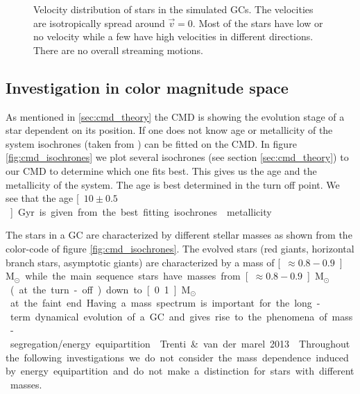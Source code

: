 \begin{figure}[htbp]
\caption{Velocity distribution of stars in the simulated \acp{GC}. The velocities are isotropically spread around \(\vec{v}=0\). Most of the stars have low or no velocity while a few have high velocities in different directions. There are no overall streaming motions.}
\label{fig:velocity_scatter}
\end{figure}


\subsection{Investigation in color magnitude space}\label{sec:cmd_plots}
As mentioned in \ref{sec:cmd_theory} the \ac{CMD} is showing the evolution stage of a star dependent on its position. If one does not know age or metallicity of the system isochrones (taken from \citet{2012MNRAS.427..127B}) can be fitted on the \ac{CMD}. In figure \ref{fig:cmd_isochrones} we plot several isochrones (see section \ref{sec:cmd_theory}) to our \ac{CMD} to determine which one fits best. This gives us the age and the metallicity of the system. The age is best determined in the turn off point. We see that the age \unit[\(10\pm0.5\)]{Gyr} is given from the best fitting isochrones. \color{red} metallicity \color{black} 
\par The stars in a \ac{GC} are characterized by different stellar masses as shown from the color-code of figure \ref{fig:cmd_isochrones}. The evolved stars (red giants, horizontal branch stars, asymptotic giants) are characterized by a mass of \unit[\(\approx0.8-0.9\)]{\(\mathrm{M}_\odot\)} while the main sequence stars have masses from \unit[\(\approx0.8-0.9\)]{\(\mathrm{M}_\odot\)} (at the turn-off) down to \unit[0.1]{M\(_\odot\)} at the faint end. Having a mass spectrum is important for the long-term dynamical evolution of a \ac{GC} and gives rise to the phenomena of mass-segregation/energy equipartition.\color{red} Trenti \& van der marel 2013 \color{black}. Throughout the following investigations we do not consider the mass dependence induced by energy equipartition and do not make a distinction for stars with different masses. 
